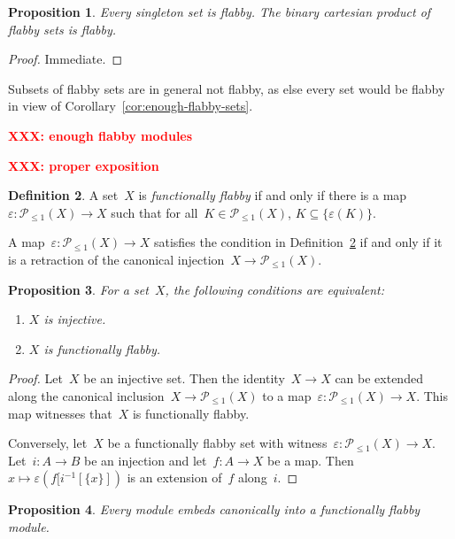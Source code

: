 \documentclass[oneside]{amsart}
\theoremstyle{definition}
\newtheorem{defn}{Definition}[section]
\theoremstyle{plain}
\newtheorem{prop}[defn]{Proposition}
\theoremstyle{remark}
\newcommand{\XXX}[1]{\textbf{\textcolor{red}{XXX: #1}}}
\renewcommand{\P}{\mathcal{P}}
\renewcommand{\_}{\mathpunct{.}\,}
\begin{document}
\begin{prop}Every singleton set is flabby. The binary cartesian product of flabby sets
is flabby.\end{prop}

\begin{proof}Immediate.\end{proof}

Subsets of flabby sets are in general not flabby, as else every set would be
flabby in view of Corollary~\ref{cor:enough-flabby-sets}.

\XXX{enough flabby modules}

\XXX{proper exposition}

\begin{defn}\label{defn:functionally-flabby}
A set~$X$ is \emph{functionally flabby} if and only if there is a
map~$\varepsilon : \P_{\leq1}(X) \to X$ such that for all~$K \in
\P_{\leq1}(X)$, $K \subseteq \{ \varepsilon(K) \}$.\end{defn}

A map~$\varepsilon : \P_{\leq1}(X) \to X$ satisfies the condition in
Definition~\ref{defn:functionally-flabby} if and only if it is a retraction of
the canonical injection~$X \to \P_{\leq1}(X)$.

\begin{prop}For a set~$X$, the following conditions are equivalent:
\begin{enumerate}
\item $X$ is injective.
\item $X$ is functionally flabby.
\end{enumerate}
\end{prop}

\begin{proof}Let~$X$ be an injective set. Then the identity~$X \to X$ can be extended
along the canonical inclusion~$X \to \P_{\leq1}(X)$ to a map~$\varepsilon :
\P_{\leq1}(X) \to X$. This map witnesses that~$X$ is functionally flabby.

Conversely, let~$X$ be a functionally flabby set with witness~$\varepsilon :
\P_{\leq1}(X) \to X$. Let~$i : A \to B$ be an injection and let~$f : A \to X$
be a map. Then~$x \mapsto \varepsilon(f[i^{-1}[\{x\}])$ is an extension of~$f$
along~$i$.
\end{proof}

\begin{prop}Every module embeds canonically into a functionally flabby module.\end{prop}
\end{document}
